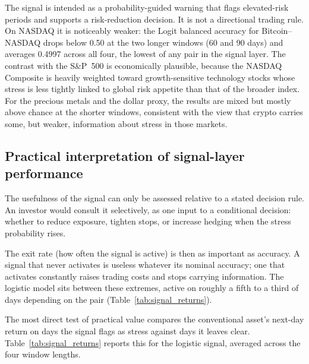 The signal is intended as a probability-guided warning that flags elevated-risk periods and supports a risk-reduction decision. It is not a directional trading rule. On NASDAQ it is noticeably weaker: the Logit balanced accuracy for Bitcoin--NASDAQ drops below 0.50 at the two longer windows (60 and 90 days) and averages 0.4997 across all four, the lowest of any pair in the signal layer. The contrast with the S\&P~500 is economically plausible, because the NASDAQ Composite is heavily weighted toward growth-sensitive technology stocks whose stress is less tightly linked to global risk appetite than that of the broader index. For the precious metals and the dollar proxy, the results are mixed but mostly above chance at the shorter windows, consistent with the view that crypto carries some, but weaker, information about stress in those markets.

\subsection{Practical interpretation of signal-layer performance}

The usefulness of the signal can only be assessed relative to a stated decision rule. An investor would consult it selectively, as one input to a conditional decision: whether to reduce exposure, tighten stops, or increase hedging when the stress probability rises.

The exit rate (how often the signal is active) is then as important as accuracy. A signal that never activates is useless whatever its nominal accuracy; one that activates constantly raises trading costs and stops carrying information. The logistic model sits between these extremes, active on roughly a fifth to a third of days depending on the pair (Table~\ref{tab:signal_returns}).

The most direct test of practical value compares the conventional asset's next-day return on days the signal flags as stress against days it leaves clear. Table~\ref{tab:signal_returns} reports this for the logistic signal, averaged across the four window lengths.

